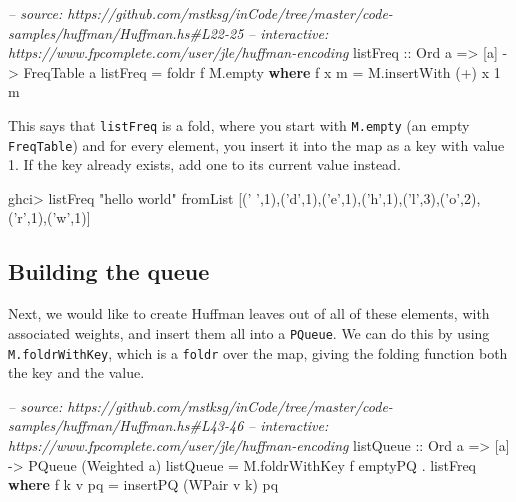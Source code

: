 \documentclass[]{article}
\newenvironment{Shaded}{}{}
\newcommand{\KeywordTok}[1]{\textcolor[rgb]{0.00,0.44,0.13}{\textbf{#1}}}
\newcommand{\DataTypeTok}[1]{\textcolor[rgb]{0.56,0.13,0.00}{#1}}
\newcommand{\DecValTok}[1]{\textcolor[rgb]{0.25,0.63,0.44}{#1}}
\newcommand{\CharTok}[1]{\textcolor[rgb]{0.25,0.44,0.63}{#1}}
\newcommand{\StringTok}[1]{\textcolor[rgb]{0.25,0.44,0.63}{#1}}
\newcommand{\CommentTok}[1]{\textcolor[rgb]{0.38,0.63,0.69}{\textit{#1}}}
\newcommand{\OtherTok}[1]{\textcolor[rgb]{0.00,0.44,0.13}{#1}}
\newcommand{\FunctionTok}[1]{\textcolor[rgb]{0.02,0.16,0.49}{#1}}
\newcommand{\NormalTok}[1]{#1}
\begin{document}
\begin{Shaded}
\begin{Highlighting}[]
\CommentTok{-- source: https://github.com/mstksg/inCode/tree/master/code-samples/huffman/Huffman.hs#L22-25}
\CommentTok{-- interactive: https://www.fpcomplete.com/user/jle/huffman-encoding}
\OtherTok{listFreq ::} \DataTypeTok{Ord}\NormalTok{ a }\OtherTok{=>}\NormalTok{ [a] }\OtherTok{->} \DataTypeTok{FreqTable}\NormalTok{ a}
\NormalTok{listFreq }\FunctionTok{=}\NormalTok{ foldr f M.empty}
  \KeywordTok{where}
\NormalTok{    f x m }\FunctionTok{=}\NormalTok{ M.insertWith (}\FunctionTok{+}\NormalTok{) x }\DecValTok{1}\NormalTok{ m}
\end{Highlighting}
\end{Shaded}

This says that \texttt{listFreq} is a fold, where you start with
\texttt{M.empty} (an empty \texttt{FreqTable}) and for every element, you insert
it into the map as a key with value 1. If the key already exists, add one to its
current value instead.

\begin{Shaded}
\begin{Highlighting}[]
\NormalTok{ghci}\FunctionTok{>}\NormalTok{ listFreq }\StringTok{"hello world"}
\NormalTok{fromList [(}\CharTok{' '}\NormalTok{,}\DecValTok{1}\NormalTok{),(}\CharTok{'d'}\NormalTok{,}\DecValTok{1}\NormalTok{),(}\CharTok{'e'}\NormalTok{,}\DecValTok{1}\NormalTok{),(}\CharTok{'h'}\NormalTok{,}\DecValTok{1}\NormalTok{),(}\CharTok{'l'}\NormalTok{,}\DecValTok{3}\NormalTok{),(}\CharTok{'o'}\NormalTok{,}\DecValTok{2}\NormalTok{),(}\CharTok{'r'}\NormalTok{,}\DecValTok{1}\NormalTok{),(}\CharTok{'w'}\NormalTok{,}\DecValTok{1}\NormalTok{)]}
\end{Highlighting}
\end{Shaded}

\subsection{Building the queue}\label{building-the-queue}

Next, we would like to create Huffman leaves out of all of these elements, with
associated weights, and insert them all into a \texttt{PQueue}. We can do this
by using \texttt{M.foldrWithKey}, which is a \texttt{foldr} over the map, giving
the folding function both the key and the value.

\begin{Shaded}
\begin{Highlighting}[]
\CommentTok{-- source: https://github.com/mstksg/inCode/tree/master/code-samples/huffman/Huffman.hs#L43-46}
\CommentTok{-- interactive: https://www.fpcomplete.com/user/jle/huffman-encoding}
\OtherTok{listQueue ::} \DataTypeTok{Ord}\NormalTok{ a }\OtherTok{=>}\NormalTok{ [a] }\OtherTok{->} \DataTypeTok{PQueue}\NormalTok{ (}\DataTypeTok{Weighted}\NormalTok{ a)}
\NormalTok{listQueue }\FunctionTok{=}\NormalTok{ M.foldrWithKey f emptyPQ }\FunctionTok{.}\NormalTok{ listFreq}
  \KeywordTok{where}
\NormalTok{    f k v pq }\FunctionTok{=}\NormalTok{ insertPQ (}\DataTypeTok{WPair}\NormalTok{ v k) pq}
\end{Highlighting}
\end{Shaded}
\end{document}
